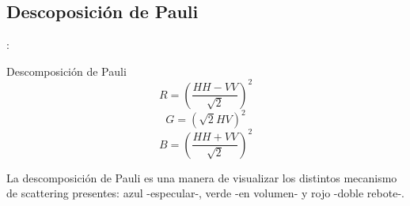 
\subsection{Descoposición de Pauli}

\begin{frame}{\secname : \subsecname}
     \begin{block}{Descomposición de Pauli}
      \begin{equation}
        R = \left(\frac{HH-VV}{\sqrt{2}}\right)^2
      \end{equation}
      \begin{equation}
        G = \left(\sqrt{2}HV\right)^2
      \end{equation}
      \begin{equation}
        B = \left(\frac{HH+VV}{\sqrt{2}}\right)^2
      \end{equation}
     \end{block}
    La descomposición de Pauli es una manera de visualizar los distintos mecanismo de scattering presentes: azul -especular-, verde -en volumen- y rojo -doble rebote-.
\end{frame}

